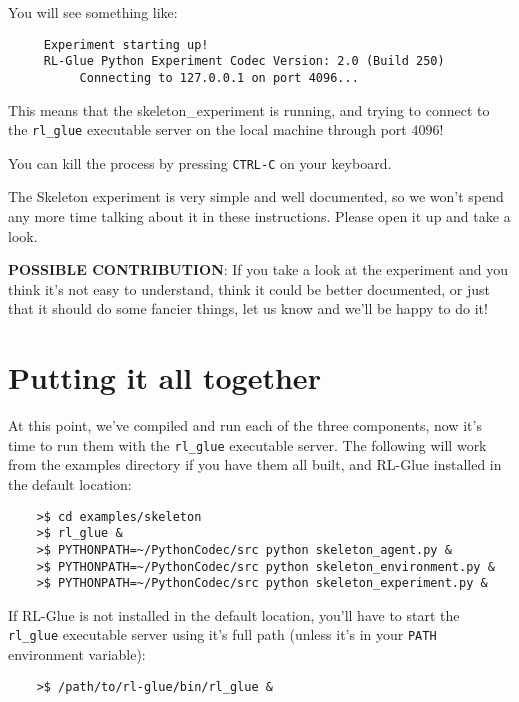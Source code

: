 \documentclass[11pt]{article}
\begin{document}
You will see something like:
\begin{verbatim}
     Experiment starting up!
     RL-Glue Python Experiment Codec Version: 2.0 (Build 250)
          Connecting to 127.0.0.1 on port 4096...
\end{verbatim}

This means that the skeleton\_experiment is running, and trying to connect to the \texttt{rl\_glue} executable server on the local machine through port $4096$!  

You can kill the process by pressing \texttt{CTRL-C} on your keyboard.


The Skeleton experiment is very simple and well documented, so we won't spend any more time talking about it in these instructions.
Please open it up and take a look.

\textbf{POSSIBLE CONTRIBUTION}: If you take a look at the experiment and you think it's not easy to understand, think it could be better documented, 
or just that it should do some fancier things, let us know and we'll be happy to do it!

\section{Putting it all together}
At this point, we've compiled and run each of the three components, now it's time to run them with the \texttt{rl\_glue} executable server.  The following will work from the examples 
directory if you have them all built, and RL-Glue installed in the default location:
\begin{verbatim}
	>$ cd examples/skeleton
	>$ rl_glue &
	>$ PYTHONPATH=~/PythonCodec/src python skeleton_agent.py &
	>$ PYTHONPATH=~/PythonCodec/src python skeleton_environment.py &
	>$ PYTHONPATH=~/PythonCodec/src python skeleton_experiment.py &
\end{verbatim}

If RL-Glue is not installed in the default location, you'll have to start the \texttt{rl\_glue} executable server using it's full path (unless it's in your \texttt{PATH} environment variable):
\begin{verbatim}
	>$ /path/to/rl-glue/bin/rl_glue &
\end{verbatim}
\end{document}
